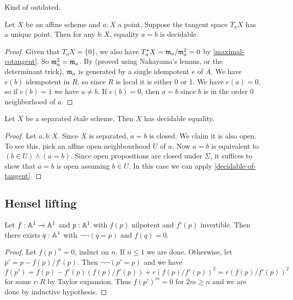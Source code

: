 Kind of outdated.

\begin{proposition}%
	\label{decidable-of-tangent}
	Let $X$ be an affine scheme and $a : X$ a point. Suppose the tangent space
	$T_a X$ has a unique point. Then for any $b : X$, equality $a = b$ is decidable.
\end{proposition}

\begin{proof}
	Given that $T_a X = \{0\}$, we also have $T^\star_a X = \mathfrak{m}_a / \mathfrak{m}_a^2 = 0$
	by \cref{maximal-cotangent}.
	So $\mathfrak{m}_a^2 = \mathfrak{m}_a$. By \cite[Lemma II.4.6]{lombardi-quitte}
	(proved using Nakayama's lemms, or the determinant trick), $\mathfrak{m}_a$ is generated
	by a single idempotent $e$ of $A$. We have $e(b)$ idempotent in $R$,
	so since $R$ is local it is either 0 or 1. We have $e(a) = 0$, so if $e(b) = 1$
	we have $a \ne b$. If $e(b) = 0$, then $a = b$ since $b$ is in the order 0
	neighborhood of $a$.
\end{proof}

\begin{proposition}%
	Let $X$ be a separated \'{e}tale scheme. Then $X$ has decidable equality.
\end{proposition}

\begin{proof}
	Let $a, b : X$. Since $X$ is separated, $a = b$ is closed.
	We claim it is also open.
	To see this, pick an affine open neighbourhood $U$ of $a$.
	Now $a = b$ is equivalent to $(b \in U) \wedge (a = b)$.
	Since open propositions are closed under $\Sigma$,
	it suffices to show that $a = b$ is open assuming $b \in U$.
	In this case we can apply \cref{decidable-of-tangent}.
\end{proof}

\subsection{Hensel lifting}

\begin{lemma}
  Let $f : \mathbb{A}^1 \to \mathbb{A}^1$ and
  $p : \mathbb{A}^1$ with $f(p)$ nilpotent and
  $f'(p)$ invertible.
  Then there exists $q : \mathbb{A}^1$
  with $\lnot \lnot (q = p)$
  and $f(q) = 0$.
\end{lemma}

\begin{proof}
  Let $f(p)^n = 0$, induct on $n$.
  If $n \leq 1$ we are done.
  Otherwise, let $p' = p - f(p)/f'(p)$.
  Then $\lnot \lnot (p' = p)$ and we have
  \[ f(p')
     = f(p) - f'(p) (f(p)/f'(p)) + r (f(p)/f'(p))^2
     = r (f(p)/f'(p))^2 \]
  for some $r : R$
  by Taylor expansion.
  Thus ${f(p')}^m = 0$ for $2m \geq n$
  and we are done by inductive hypothesis.
\end{proof}

